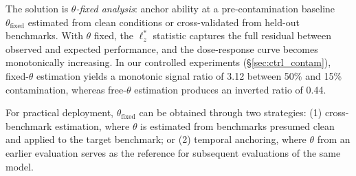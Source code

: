 The solution is \emph{$\theta$-fixed analysis}: anchor ability at a pre-contamination baseline $\theta_{\text{fixed}}$ estimated from clean conditions or cross-validated from held-out benchmarks.
With $\theta$ fixed, the $\ell_z^*$ statistic captures the full residual between observed and expected performance, and the dose-response curve becomes monotonically increasing.
In our controlled experiments (\S\ref{sec:ctrl_contam}), fixed-$\theta$ estimation yields a monotonic signal ratio of 3.12 between 50\% and 15\% contamination, whereas free-$\theta$ estimation produces an inverted ratio of 0.44.

For practical deployment, $\theta_{\text{fixed}}$ can be obtained through two strategies: (1) cross-benchmark estimation, where $\theta$ is estimated from benchmarks presumed clean and applied to the target benchmark; or (2) temporal anchoring, where $\theta$ from an earlier evaluation serves as the reference for subsequent evaluations of the same model.
